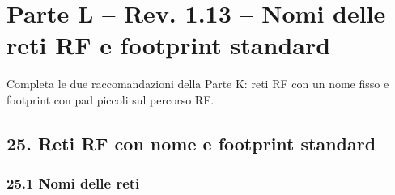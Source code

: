 \clearpage
\section[Parte L – Rev. 1.13 – Nomi delle reti RF e footprint standard]{Parte L – Rev. 1.13 – Nomi delle reti RF e footprint standard}

Completa le due raccomandazioni della Parte K: reti RF con un nome fisso e footprint con pad piccoli sul percorso RF.

\subsection[25. Reti RF con nome e footprint standard]{25. Reti RF con nome e footprint standard }

\subsubsection[25.1 Nomi delle reti]{25.1 Nomi delle reti}

